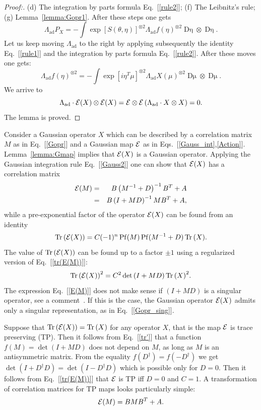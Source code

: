 \documentclass[twocolumn,showpacs,preprintnumbers,superscriptaddress]{revtex4}
\newcommand{\calE}{{\cal E }}
\newcommand{\D}[1]{\mathop{\mathrm{D}#1}}
\newcommand{\ad}{{\mathrm{ad}}}
\newcommand{\be}{\begin{equation}}
\newcommand{\ee}{\end{equation}}
\newcommand{\nn}{\nonumber}
\newcommand{\Pf}[1]{\mathop{\mathrm{Pf}(#1)}}
\DeclareMathOperator*{\tr}{\mathop{\mathrm{Tr}}}
\begin{document}
\begin{proof}[Proof:]
(d) The integration by parts formula Eq.~[\ref{rule2}]; 
(f) The Leibnitz's rule; (g) Lemma~\ref{lemma:Gopr1}.
After these steps one gets
\[
\Lambda_{\ad} P_X=
-\int \exp{[S(\theta,\eta)]}^{\otimes 2}
\Lambda_{\ad} f(\eta)^{\otimes 2}
\D{\eta}\otimes \D{\eta}.
\]
Let us keep moving $\Lambda_{\ad}$ to the right by applying subsequently
the identity Eq.~[\ref{rule1}] and the integration by parts formula
Eq.~[\ref{rule2}]. After these moves one gets:
\[
\Lambda_{\ad} f(\eta)^{\otimes 2} =
-\int
\exp{[i\eta^T\mu]}^{\otimes 2}
\Lambda_{\ad}
X(\mu)^{\otimes 2}
\D{\mu}\otimes \D{\mu}.
\]
We arrive to
\[
\Lambda_{\ad}\cdot  \calE(X)\otimes \calE(X)
= \calE \otimes \calE \left( \Lambda_{\ad}\cdot  X\otimes X \right)=0.
\]
The lemma is proved.
\end{proof}

Consider a Gaussian operator $X$ which can be described by a correlation matrix $M$
as in Eq.~[\ref{Gopr}] and a Gaussian map $\calE$ as in Eqs.~[\ref{Gauss_int},\ref{Action}].
Lemma~\ref{lemma:Gmap}  implies that $\calE(X)$ is a Gaussian operator. Applying
the Gaussian integration rule Eq.~[\ref{Gauss2}] one can show that $\calE(X)$
has a correlation matrix
\begin{eqnarray}\label{E(M)}
\calE(M) &=& B \left( M^{-1} + D \right)^{-1} B^T + A \\ \nn
&=& B \left( I + MD \right)^{-1} M B^T +A, \nn
\end{eqnarray}
while a pre-exponential factor of the operator $\calE(X)$ can be found from
an  identity
\be\label{tr(E(M))}
\tr{ \left(\calE(X)\right)} = C (-1)^n \Pf{M} \Pf{M^{-1}+D} \tr{(X)}.
\ee
The value of $\tr{(\calE(X))}$
can be found up to a factor $\pm 1$ using a regularized version of Eq.~[\ref{tr(E(M))}]:
\be\label{tr'}
\tr{ \left( \calE(X) \right) }^2 = C^2 \det{\left( I + M D \right) } \tr{(X)}^2.
\ee
The expression Eq.~[\ref{E(M)}]  does not make sense if $(I+MD)$ is a singular
operator, see a comment~\cite{comment3}.
If this is the case, the Gaussian operator $\calE(X)$ admits only a 
singular representation, as in Eq.~[\ref{Gopr_sing}]. 

Suppose that $\tr{(\calE(X))}=\tr{(X)}$ for any operator $X$, that is
the map $\calE$ is trace preserving (TP). Then it follows from Eq.~[\ref{tr'}]
that a function $f(M)=\det{(I+ MD)}$ does not depend on $M$, as 
long as $M$ is an antisymmetric matrix. From the equality 
$f(D^\dag)=f(-D^\dag)$ we get $\det{(I+D^\dag D)}=\det{(I-D^\dag D)}$ which is
possible only for $D=0$. 
Then it follows from Eq.~[\ref{tr(E(M))}] that
$\calE$ is TP iff
$D=0$ and $C=1$. A transformation of correlation matrices for TP maps
looks particularly simple:
\[
\calE(M)=B M B^T +A.
\]
\end{document}
